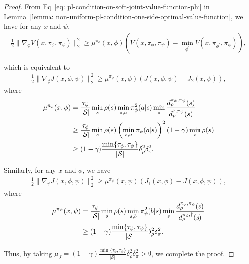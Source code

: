 \documentclass{article}
\theoremstyle{plain}
\theoremstyle{definition}
\theoremstyle{remark}
\def\cS{\mathcal S}
\begin{document}
\begin{proof}
    From Eq~\eqref{eq: pl-condition-on-soft-joint-value-function-phi} in Lemma~\ref{lemma: non-uniform-pl-condition-one-side-optimal-value-function}, we have for any $x$ and $\psi$,  
    \begin{align}
        \frac{1}{2} \|\nabla_\phi V(x,\pi_\phi,\pi_\psi) \|_2^2 \geq \mu^{\pi_\phi}(x,\phi) \left( V(x,\pi_\phi,\pi_\psi) - \min_{\phi^\prime} V(x,\pi_{\phi^\prime},\pi_\psi) \right), 
    \end{align}
     
    which is equivalent to
    \begin{align}
        \frac{1}{2} \|\nabla_\phi J(x,\phi,\psi) \|_2^2 \geq \mu^{\pi_\phi}(x,\phi) \left( J(x,\phi,\psi) - J_2(x,\psi) \right),
    \end{align}
    where
    \begin{align}
        \mu^{\pi_\psi}(x,\phi) & = \frac{\tau_\phi}{|\cS|}  \min_s \rho(s) \min_{s,a} \pi_\phi^2(a|s) \min_s \frac{d^{\pi_\phi,\pi_\psi}_\rho (s) }{d^{\dag,\pi_\psi}_\rho(s)}  \notag\\
        & \geq \frac{\tau_\phi}{|\cS|}  \min_s \rho(s) \left( \min_{s,a} \pi_\phi(a|s) \right)^2 (1-\gamma) \min_s \rho(s) \notag\\
        & \geq  (1-\gamma)\frac{\min\{\tau_\phi,\tau_\psi\}}{|\cS|} \delta_\rho^2 \delta_\pi^2 .
    \end{align}

    Similarly, for any $x$ and $\phi$, we have
    \begin{align}
        \frac{1}{2} \|\nabla_\psi J(x,\phi,\psi) \|_2^2 \geq \mu^{\pi_\psi}(x,\psi) \left( J_1(x,\phi) - J(x,\phi,\psi) \right),
    \end{align}
    where 
    \begin{align}
        \mu^{\pi_\psi}(x,\psi) & = \frac{\tau_\psi}{|\cS|} \min_s \rho(s) \min_{s,b} \pi_\psi^2(b|s) \min_{s} \frac{d^{\pi_\phi, \pi_\psi}_{\rho}(s)}{d^{\pi_\phi,\dag}_{\rho}(s)} \notag \\
        & \geq (1-\gamma)\frac{\min\{\tau_\phi,\tau_\psi\}}{|\cS|} \delta_\rho^2 \delta_\pi^2.
    \end{align}

    Thus, by taking $\mu_J = (1-\gamma)\frac{\min\{\tau_\phi,\tau_\psi\}}{|\cS|} \delta_\rho^2 \delta_\pi^2 > 0$, we complete the proof.
\end{proof}
\end{document}
